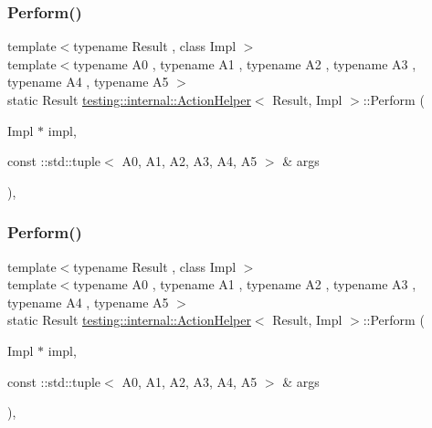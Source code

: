 \mbox{\label{classtesting_1_1internal_1_1_action_helper_a480c73c3de89e2626653ca249e986d03}} 
\subsubsection{\texorpdfstring{Perform()}{Perform()}\hspace{0.1cm}{\footnotesize\ttfamily [13/33]}}
{\footnotesize\ttfamily template$<$typename Result , class Impl $>$ \\
template$<$typename A0 , typename A1 , typename A2 , typename A3 , typename A4 , typename A5 $>$ \\
static Result \mbox{\hyperlink{classtesting_1_1internal_1_1_action_helper}{testing\+::internal\+::\+Action\+Helper}}$<$ Result, Impl $>$\+::Perform (\begin{DoxyParamCaption}\item[{Impl $\ast$}]{impl,  }\item[{const \+::std\+::tuple$<$ A0, A1, A2, A3, A4, A5 $>$ \&}]{args }\end{DoxyParamCaption})\hspace{0.3cm}{\ttfamily [inline]}, {\ttfamily [static]}}

\mbox{\label{classtesting_1_1internal_1_1_action_helper_a480c73c3de89e2626653ca249e986d03}} 
\subsubsection{\texorpdfstring{Perform()}{Perform()}\hspace{0.1cm}{\footnotesize\ttfamily [14/33]}}
{\footnotesize\ttfamily template$<$typename Result , class Impl $>$ \\
template$<$typename A0 , typename A1 , typename A2 , typename A3 , typename A4 , typename A5 $>$ \\
static Result \mbox{\hyperlink{classtesting_1_1internal_1_1_action_helper}{testing\+::internal\+::\+Action\+Helper}}$<$ Result, Impl $>$\+::Perform (\begin{DoxyParamCaption}\item[{Impl $\ast$}]{impl,  }\item[{const \+::std\+::tuple$<$ A0, A1, A2, A3, A4, A5 $>$ \&}]{args }\end{DoxyParamCaption})\hspace{0.3cm}{\ttfamily [inline]}, {\ttfamily [static]}}

